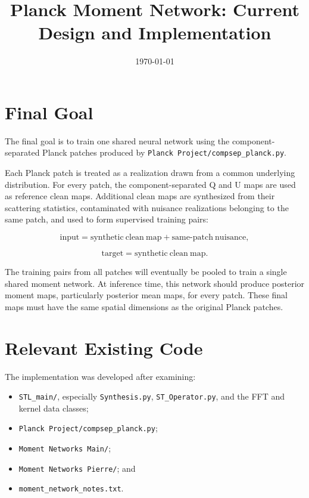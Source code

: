 \documentclass[11pt]{article}
\title{Planck Moment Network: Current Design and Implementation}
\author{}
\date{\today}
\begin{document}
\maketitle

\section{Final Goal}

The final goal is to train one shared neural network using the
component-separated Planck patches produced by
\texttt{Planck Project/compsep\_planck.py}.

Each Planck patch is treated as a realization drawn from a common underlying
distribution.  For every patch, the component-separated Q and U maps are used
as reference clean maps.  Additional clean maps are synthesized from their
scattering statistics, contaminated with nuisance realizations belonging to
the same patch, and used to form supervised training pairs:

\begin{equation}
  \mathrm{input} = \mathrm{synthetic\ clean\ map} + \mathrm{same\mbox{-}patch\ nuisance},
\end{equation}

\begin{equation}
  \mathrm{target} = \mathrm{synthetic\ clean\ map}.
\end{equation}

The training pairs from all patches will eventually be pooled to train a
single shared moment network.  At inference time, this network should produce
posterior moment maps, particularly posterior mean maps, for every patch.
These final maps must have the same spatial dimensions as the original Planck
patches.

\section{Relevant Existing Code}

The implementation was developed after examining:

\begin{itemize}
  \item \texttt{STL\_main/}, especially \texttt{Synthesis.py},
        \texttt{ST\_Operator.py}, and the FFT and kernel data classes;
  \item \texttt{Planck Project/compsep\_planck.py};
  \item \texttt{Moment Networks Main/};
  \item \texttt{Moment Networks Pierre/}; and
  \item \texttt{moment\_network\_notes.txt}.
\end{itemize}
\end{document}
